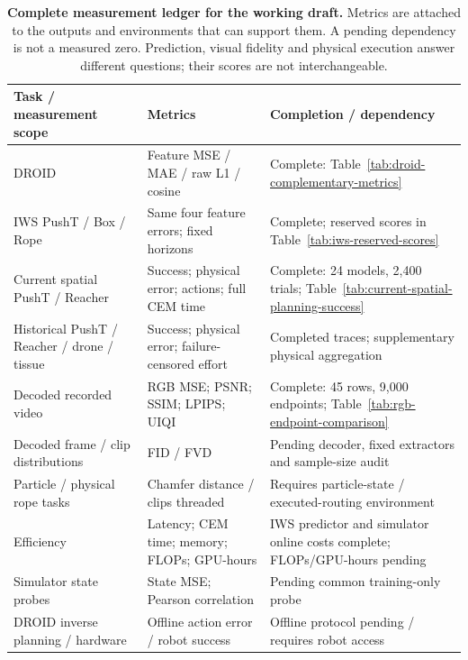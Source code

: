 \begin{table}[!htb]\centering\small
\setlength{\tabcolsep}{3pt}\renewcommand{\arraystretch}{1.15}
\begin{tabular}{@{}>{\raggedright\arraybackslash}p{.22\linewidth}>{\raggedright\arraybackslash}p{.31\linewidth}>{\raggedright\arraybackslash}p{.41\linewidth}@{}}
\toprule Task / measurement scope & Metrics & Completion / dependency \\ \midrule
DROID & Feature MSE / MAE / raw L1 / cosine & Complete: Table~\ref{tab:droid-complementary-metrics} \\
IWS PushT / Box / Rope & Same four feature errors; fixed horizons & Complete; reserved scores in Table~\ref{tab:iws-reserved-scores} \\
Current spatial PushT / Reacher & Success; physical error; actions; full CEM time & Complete: 24 models, 2,400 trials; Table~\ref{tab:current-spatial-planning-success} \\
Historical PushT / Reacher / drone / tissue & Success; physical error; failure-censored effort & Completed traces; supplementary physical aggregation \\
Decoded recorded video & RGB MSE; PSNR; SSIM; LPIPS; UIQI & Complete: 45 rows, 9,000 endpoints; Table~\ref{tab:rgb-endpoint-comparison} \\
Decoded frame / clip distributions & FID / FVD & Pending decoder, fixed extractors and sample-size audit \\
Particle / physical rope tasks & Chamfer distance / clips threaded & Requires particle-state / executed-routing environment \\
Efficiency & Latency; CEM time; memory; FLOPs; GPU-hours & IWS predictor and simulator online costs complete; FLOPs/GPU-hours pending \\
Simulator state probes & State MSE; Pearson correlation & Pending common training-only probe \\
DROID inverse planning / hardware & Offline action error / robot success & Offline protocol pending / requires robot access \\
\bottomrule\end{tabular}
\caption{\textbf{Complete measurement ledger for the working draft.} Metrics are
attached to the outputs and environments that can support them. A pending
dependency is not a measured zero. Prediction, visual fidelity and physical
execution answer different questions; their scores are not interchangeable.}
\label{tab:metric-completion-coverage}\end{table}
